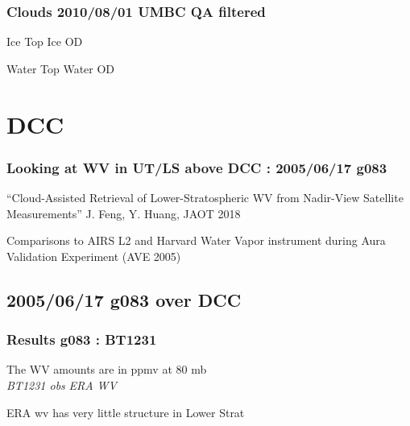 \documentclass[10pt,t]{beamer}
\begin{document}
\begin{frame}
  \frametitle{Clouds 2010/08/01 UMBC QA filtered}

  Ice Top  \hspace{2.0in} Ice OD\\
  \begin{center}
  \end{center}

  Water Top \hspace{2.0in} Water OD\\
  \begin{center}
  \end{center}

\end{frame}
\section{DCC}
\begin{frame}
  \frametitle{Looking at WV in UT/LS above DCC : 2005/06/17 g083}
  ``Cloud-Assisted Retrieval of Lower-Stratospheric WV from Nadir-View Satellite
    Measurements''  J. Feng, Y. Huang, JAOT 2018

\begin{small}
Comparisons to  AIRS L2 and Harvard Water Vapor instrument during Aura
Validation Experiment (AVE 2005)
\end{small}


\end{frame}

\subsection{2005/06/17 g083 over DCC}
\begin{frame}
\frametitle{Results g083 : BT1231}
The WV amounts are in ppmv at 80 mb\\
\hspace{0.5in} \emph{BT1231 obs}  \hspace{2.0in} \emph{ERA WV} \\
\begin{center}
\end{center}
ERA wv has very little structure in Lower Strat
\end{frame}
\end{document}
